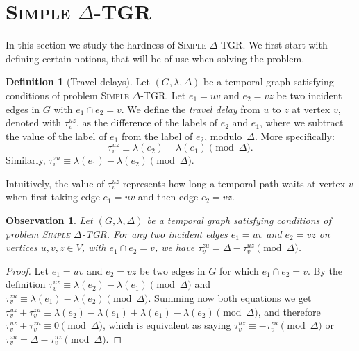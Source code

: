 \documentclass[11pt,a4paper]{article}
\newtheorem{observation}{Observation}
\theoremstyle{remark}
\theoremstyle{definition}
\newtheorem{definition}[theorem]{Definition}
\newcommand{\deltaExact}{\textsc{Simple $\Delta$-TGR}}
\begin{document}

\section{
\texorpdfstring{\deltaExact\ } {Simple Delta-TGR}}

In this section we study the hardness of \deltaExact. We first start with defining certain notions, that will be of use when solving the problem.

    \begin{definition}[Travel delays]
    Let $(G, \lambda, \Delta)$ be a temporal graph satisfying conditions of problem \deltaExact.
    Let $e_1=uv$ and $e_2=vz$ be two incident edges in $G$ with $e_1 \cap e_2 = v$.
    We define the \emph{travel delay} from $u$ to $z$ at vertex $v$, denoted with $\tau_v^{uz}$,
    as the difference of the labels of $e_2$ and $e_1$, where we subtract the value of the label of $e_1$ from the label of $e_2$,  modulo~$\Delta$.
    More specifically:
    \begin{equation}\label{eq:def-VertexWaitingTime}
       \tau_v^{uz} \equiv \lambda (e_2) - \lambda(e_1) \pmod \Delta.
    \end{equation}
    Similarly, $\tau_v^{zu} \equiv \lambda (e_1) - \lambda(e_2) \pmod \Delta$.
    \end{definition}
    Intuitively, the value of $\tau_v^{uz}$ represents how long a temporal path waits at vertex $v$ when first taking edge $e_1=uv$ and then edge $e_2 = vz$.
    
    \begin{observation}\label{obs:travel-delays-both-directions}
    Let $(G, \lambda, \Delta)$ be a temporal graph satisfying conditions of problem \deltaExact.
    For any two incident edges $e_1 = uv$ and $e_2 = vz$ on vertices $u,v,z \in V$, with $e_1 \cap e_2 = v$, we have $\tau_v^{zu} = \Delta - \tau_v^{uz} \pmod \Delta$.
    \end{observation}
    
    \begin{proof}
        Let $e_1 = uv$ and $e_2 = vz$ be two edges in $G$ for which $e_1 \cap e_2 = v$. 
        By the definition $\tau_v^{uz} \equiv \lambda (e_2) - \lambda(e_1) \pmod \Delta$ and $\tau_v^{zu} \equiv \lambda (e_1) - \lambda(e_2) \pmod \Delta$.
        Summing now both equations we get $\tau_v^{uz} + \tau_v^{zu} \equiv \lambda(e_2) - \lambda(e_1) + \lambda (e_1) - \lambda(e_2) \pmod \Delta$, and therefore $\tau_v^{uz} + \tau_v^{zu} \equiv 0 \pmod \Delta$, which is equivalent as saying $\tau_v^{uz} \equiv - \tau_v^{zu} \pmod \Delta$ or $\tau_v^{zu} = \Delta - \tau_v^{uz} \pmod \Delta$.
    \end{proof}
\end{document}
